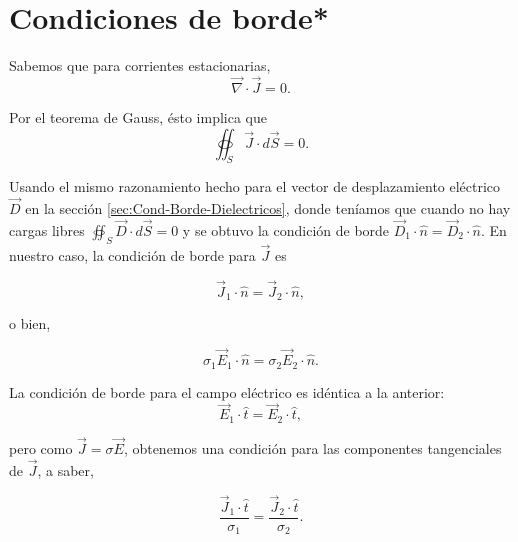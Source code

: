 \section{Condiciones de borde*}
Sabemos que para corrientes estacionarias,
$$\Vec{\nabla} \cdot \Vec{J} = 0.$$

Por el teorema de Gauss, ésto implica que
$$\oiint_S \Vec{J} \cdot d\Vec{S} = 0.$$

Usando el mismo razonamiento hecho para el vector de desplazamiento eléctrico $\Vec{D}$ en la sección \ref{sec:Cond-Borde-Dielectricos}, donde teníamos que cuando no hay cargas libres $\oiint_S \Vec{D} \cdot d\Vec{S} = 0$ y se obtuvo la condición de borde $\Vec{D}_1 \cdot \hat{n} = \Vec{D}_2 \cdot \hat{n}$. En nuestro caso, la condición de borde para $\Vec{J}$ es
\begin{shaded}
    $$\Vec{J}_1 \cdot \hat{n} = \Vec{J}_2 \cdot \hat{n},$$
\end{shaded}

o bien,
\begin{shaded}
    $$ \sigma_1 \Vec{E}_1 \cdot \hat{n} =  \sigma_2 \Vec{E}_2 \cdot \hat{n}.$$
\end{shaded}

La condición de borde para el campo eléctrico es idéntica a la anterior:
$$\Vec{E}_1 \cdot \hat{t} = \Vec{E}_2 \cdot \hat{t},$$

pero como $\Vec{J} = \sigma \Vec{E}$, obtenemos una condición para las componentes tangenciales de $\Vec{J}$, a saber,
\begin{shaded}
    $$\frac{\Vec{J}_1 \cdot \hat{t}}{\sigma_1} = \frac{\Vec{J}_2 \cdot \hat{t}}{\sigma_2}.$$
\end{shaded}

